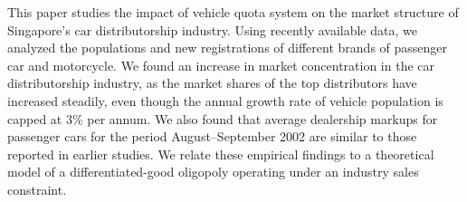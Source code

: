 This paper studies the impact of vehicle quota system on the market structure of Singapore’s car distributorship industry. Using recently available data, we analyzed the populations and new registrations of different brands of passenger car and motorcycle. We found an increase in market concentration in the car distributorship industry, as the market shares of the top distributors have increased steadily, even though the annual growth rate of vehicle population is capped at 3\% per annum. We also found that average dealership markups for passenger cars for the period August–September 2002 are similar to those reported in earlier studies. We relate these empirical findings to a theoretical model of a differentiated-good oligopoly operating under an industry sales constraint.
